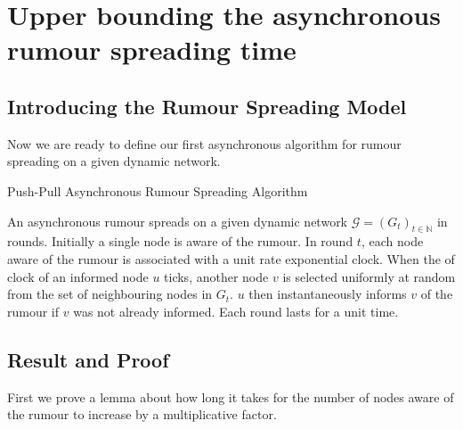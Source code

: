 \section{Upper bounding the asynchronous rumour spreading time}
\label{AsyncUpperBoundSection}

\subsection{Introducing the Rumour Spreading Model}
Now we are ready to define our first asynchronous algorithm for rumour spreading on a given dynamic network.

\begin{definition}
	Push-Pull Asynchronous Rumour Spreading Algorithm 
\end{definition}
\label{NodeCentricAsyncAlgorithm}

\noindent
An asynchronous rumour spreads on a given dynamic network $\mathcal{G} = (G_t)_{t\in \mathbb{N}}$ in rounds. Initially a single node is aware of the rumour. In round $t$, each node aware of the rumour is associated with a unit rate exponential clock. When the of clock of an informed node $u$ ticks, another node $v$ is selected uniformly at random from the set of neighbouring nodes in $G_t$. $u$ then instantaneously informs $v$ of the rumour if $v$ was not already informed. Each round lasts for a unit time. %





\subsection{Result and Proof}

First we prove a lemma about how long it takes for the number of nodes aware of the rumour to increase by a multiplicative factor. 

